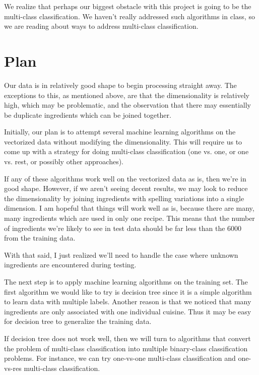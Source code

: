 \documentclass[11pt]{article}
\begin{document}
We realize that perhaps our biggest obstacle with this project is
going to be the multi-class classification.  We haven't really
addressed such algorithms in class, so we are reading about ways to
address multi-class classification.\cite{wiki}


\section{Plan}
\label{sec:plan}

Our data is in relatively good shape to begin processing straight
away.  The exceptions to this, as mentioned above, are that the
dimensionality is relatively high, which may be problematic, and the
observation that there may essentially be duplicate ingredients which
can be joined together.

Initially, our plan is to attempt several machine learning algorithms
on the vectorized data without modifying the dimensionality.  This
will require us to come up with a strategy for doing multi-class
classification (one vs. one, or one vs. rest, or possibly other
approaches).

If any of these algorithms work well on the vectorized data as is,
then we're in good shape.  However, if we aren't seeing decent
results, we may look to reduce the dimensionality by joining
ingredients with spelling variations into a single dimension.  I am
hopeful that things will work well as is, because there are many, many
ingredients which are used in only one recipe.  This means that the
number of ingredients we're likely to see in test data should be far
less than the 6000 from the training data.

With that said, I just realized we'll need to handle the case where
unknown ingredients are encountered during testing.  


The next step is to apply machine learning algorithms on the training set. The first algorithm we would like to try is decision tree since it is a simple algorithm to learn data with multiple labels. Another reason is that we noticed that many ingredients are only associated with one individual cuisine. Thus it may be easy for decision tree to generalize the training data.

If decision tree does not work well, then we will turn to algorithms that convert the problem of multi-class classification into multiple binary-class classification problems. For instance, we can try one-vs-one multi-class classification\cite{wiki} and one-vs-res multi-class classification\cite{wiki}.  



\end{document}
